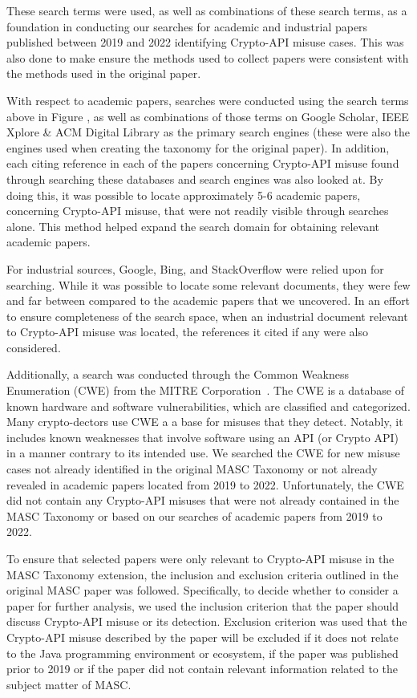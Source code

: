 These search terms were used, as well as combinations of these search terms, as a foundation in conducting our searches for academic and industrial papers published between 2019 and 2022 identifying Crypto-API misuse cases. This was also done to make ensure the methods used to collect papers were consistent with the methods used in the original paper.  

With respect to academic papers, searches were conducted using the search terms above in Figure , as well as combinations of those terms on Google Scholar, IEEE Xplore \& ACM Digital Library as the primary search engines (these were also the engines used when creating the taxonomy for the original paper). In addition, each citing reference in each of the papers concerning Crypto-API misuse found through searching these databases and search engines was also looked at.  By doing this, it was possible to locate approximately 5-6 academic papers, concerning Crypto-API misuse, that were not readily visible through searches alone. This method helped expand the search domain for obtaining relevant academic papers.

For industrial sources, Google, Bing, and StackOverflow were relied upon for searching.  While it was possible to locate some relevant documents, they were few and far between compared to the academic papers that we uncovered.  In  an effort to ensure completeness of the search space,  when an industrial document relevant to Crypto-API misuse was located, the references it cited if any were also considered.

Additionally, a search was conducted through the Common Weakness Enumeration (CWE) from the MITRE Corporation~.  The CWE is a database of known hardware and software vulnerabilities, which are classified and categorized. Many crypto-dectors use CWE a a base for misuses that they detect.  Notably, it includes known weaknesses that involve software using an API (or Crypto API) in a manner contrary to its intended use.  We searched the CWE for new misuse cases not already identified in the original MASC Taxonomy or not already revealed in academic papers located from 2019 to 2022.  Unfortunately, the CWE did not contain any Crypto-API misuses that were not already contained in the MASC Taxonomy or based on our searches of academic papers from 2019 to 2022. 

To ensure that selected papers were only relevant to Crypto-API misuse in the MASC Taxonomy extension, the inclusion and exclusion criteria outlined in the original MASC paper was followed.  Specifically, to decide whether to consider a paper for further analysis, we used the inclusion criterion that the paper should discuss Crypto-API misuse or its detection. Exclusion criterion was used that the Crypto-API misuse described by the paper will be excluded if it does not relate to the Java programming environment or ecosystem, if the paper was published prior to 2019 or if the paper did not contain relevant information related to the subject matter of MASC.
    
